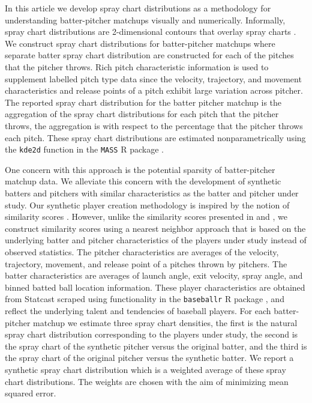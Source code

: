 \documentclass[11pt]{article}
\begin{document}
In this article we develop spray chart distributions as a methodology for understanding batter-pitcher matchups visually and numerically. Informally, spray chart distributions are 2-dimensional contours that overlay spray charts \citep{pettispray, marchi2019analyzing}. We construct spray chart distributions for batter-pitcher matchups where separate batter spray chart distribution are constructed for each of the pitches that the pitcher throws. Rich pitch characteristic information is used to supplement labelled pitch type data since the velocity, trajectory, and movement characteristics and release points of a pitch exhibit large variation across pitcher. The reported spray chart distribution for the batter pitcher matchup is the aggregation of the spray chart distributions for each pitch that the pitcher throws, the aggregation is with respect to the percentage that the pitcher throws each pitch. These spray chart distributions are estimated nonparametrically using the \texttt{kde2d} function in the \texttt{MASS} R package \citep{MASS}.

One concern with this approach is the potential sparsity of batter-pitcher matchup data. We alleviate this concern with the development of synthetic batters and pitchers with similar characteristics as the batter and pitcher under study. Our synthetic player creation methodology is inspired by the notion of similarity scores \citep{james1994politics, PECOTA}. However, unlike the similarity scores presented in \cite{james1994politics} and \cite{PECOTA}, we construct similarity scores using a nearest neighbor approach that is based on the underlying batter and pitcher characteristics of the players under study instead of observed statistics. The pitcher characteristics are averages of the velocity, trajectory, movement, and release point of a pitches thrown by pitchers. The batter characteristics are averages of launch angle, exit velocity, spray angle, and binned batted ball location information. These player characteristics are obtained from Statcast scraped using functionality in the \texttt{baseballr} R package \citep{baseballr}, and reflect the underlying talent and tendencies of baseball players. For each batter-pitcher matchup we estimate three spray chart densities, the first is the natural spray chart distribution corresponding to the players under study, the second is the spray chart of the synthetic pitcher versus the original batter, and the third is the spray chart of the original pitcher versus the synthetic batter. We report a synthetic spray chart distribution which is a weighted average of these spray chart distributions. The weights are chosen with the aim of minimizing mean squared error.
\end{document}

